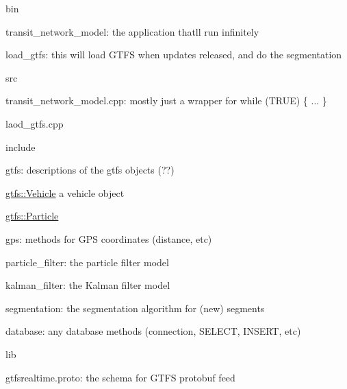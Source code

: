 \begin{DoxyItemize}
\item {\ttfamily bin}
\begin{DoxyItemize}
\item {\ttfamily transit\+\_\+network\+\_\+model}\+: the application that\textquotesingle{}ll run \textquotesingle{}infinitely\textquotesingle{}
\item {\ttfamily load\+\_\+gtfs}\+: this will load G\+T\+FS when updates released, and do the segmentation
\end{DoxyItemize}
\item {\ttfamily src}
\begin{DoxyItemize}
\item {\ttfamily transit\+\_\+network\+\_\+model.\+cpp}\+: mostly just a wrapper for {\ttfamily while (T\+R\+UE) \{ ... \}}
\item {\ttfamily laod\+\_\+gtfs.\+cpp}
\end{DoxyItemize}
\item {\ttfamily include}
\begin{DoxyItemize}
\item {\ttfamily gtfs}\+: descriptions of the gtfs objects (??)
\begin{DoxyItemize}
\item {\ttfamily \hyperlink{classgtfs_1_1Vehicle}{gtfs\+::\+Vehicle}} a vehicle object
\item {\ttfamily \hyperlink{classgtfs_1_1Particle}{gtfs\+::\+Particle}}
\end{DoxyItemize}
\item {\ttfamily gps}\+: methods for G\+PS coordinates (distance, etc)
\item {\ttfamily particle\+\_\+filter}\+: the particle filter model
\item {\ttfamily kalman\+\_\+filter}\+: the Kalman filter model
\item {\ttfamily segmentation}\+: the segmentation algorithm for (new) segments
\item {\ttfamily database}\+: any database methods (connection, S\+E\+L\+E\+CT, I\+N\+S\+E\+RT, etc)
\end{DoxyItemize}
\item {\ttfamily lib}
\begin{DoxyItemize}
\item {\ttfamily gtfsrealtime.\+proto}\+: the schema for G\+T\+FS protobuf feed 
\end{DoxyItemize}
\end{DoxyItemize}